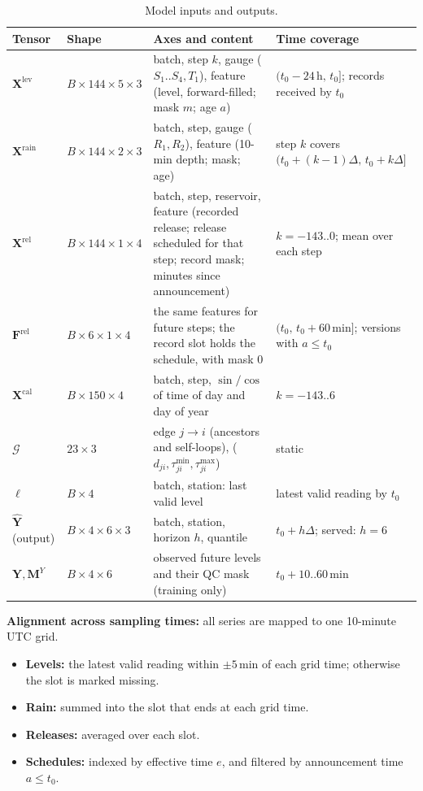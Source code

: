 \documentclass[11pt,a4paper]{article}
\begin{document}
\begin{table}[H]
\centering\small
\caption{Model inputs and outputs.}
\label{tab:io}
\begin{tabularx}{\textwidth}{@{}l l L L@{}}
\toprule
\textbf{Tensor} & \textbf{Shape} & \textbf{Axes and content} & \textbf{Time coverage} \\
\midrule
$\mathbf{X}^{\mathrm{lev}}$ & $B\times144\times5\times3$ &
batch, step $k$, gauge ($S_1..S_4,T_1$), feature (level, forward-filled; mask $m$; age $a$) &
$(t_0-24\,\mathrm{h},\,t_0]$; records received by $t_0$ \\
$\mathbf{X}^{\mathrm{rain}}$ & $B\times144\times2\times3$ &
batch, step, gauge ($R_1,R_2$), feature (10-min depth; mask; age) &
step $k$ covers $(t_0+(k-1)\Delta,\,t_0+k\Delta]$ \\
$\mathbf{X}^{\mathrm{rel}}$ & $B\times144\times1\times4$ &
batch, step, reservoir, feature (recorded release; release scheduled for that step; record mask; minutes since announcement) &
$k=-143..0$; mean over each step \\
$\mathbf{F}^{\mathrm{rel}}$ & $B\times6\times1\times4$ &
the same features for future steps; the record slot holds the schedule, with mask 0 &
$(t_0,\,t_0+60\,\mathrm{min}]$; versions with $a\le t_0$ \\
$\mathbf{X}^{\mathrm{cal}}$ & $B\times150\times4$ &
batch, step, $\sin/\cos$ of time of day and day of year &
$k=-143..6$ \\
$\mathcal{G}$ & $23\times3$ &
edge $j\!\to\!i$ (ancestors and self-loops), ($d_{ji},\tau^{\min}_{ji},\tau^{\max}_{ji}$) &
static \\
$\bm{\ell}$ & $B\times4$ & batch, station: last valid level & latest valid reading by $t_0$ \\
\midrule
$\hat{\mathbf{Y}}$ (output) & $B\times4\times6\times3$ &
batch, station, horizon $h$, quantile &
$t_0+h\Delta$; served: $h=6$ \\
$\mathbf{Y},\mathbf{M}^{Y}$ & $B\times4\times6$ & observed future levels and their QC mask (training only) & $t_0+10..60$\,min \\
\bottomrule
\end{tabularx}
\end{table}

\textbf{Alignment across sampling times:} all series are mapped to one
10-minute UTC grid.
\begin{itemize}
  \item \textbf{Levels:} the latest valid reading within $\pm5$\,min of each
        grid time; otherwise the slot is marked missing.
  \item \textbf{Rain:} summed into the slot that ends at each grid time.
  \item \textbf{Releases:} averaged over each slot.
  \item \textbf{Schedules:} indexed by effective time $e$, and filtered by
        announcement time $a\le t_0$.
\end{itemize}
\end{document}
